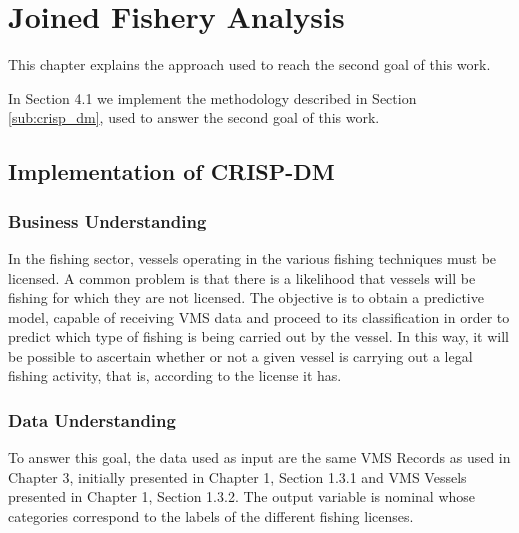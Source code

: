 % 
% 
%
\chapter{Joined Fishery Analysis}
\label{cha:server}
This chapter explains the approach used to reach the second goal of this work. 

In Section 4.1 we implement the methodology described in Section \ref{sub:crisp_dm}, used to answer the second goal of this work.



\section{Implementation of CRISP-DM} %
\label{sub:implementation}

\subsection{Business Understanding} %
\label{sub:business_understanding}

In the fishing sector, vessels operating in the various fishing techniques must be licensed.
A common problem is that there is a likelihood that vessels will be fishing for which they are not licensed. The objective is to obtain a predictive model, capable of receiving VMS data and proceed to its classification in order to predict which type of fishing is being carried out by the vessel. In this way, it will be possible to ascertain whether or not a given vessel is carrying out a legal fishing activity, that is, according to the license it has.





\subsection{Data Understanding} %
\label{sub:data_understanding}

To answer this goal, the data used as input are the same VMS Records as used in Chapter 3, initially presented in Chapter 1, Section 1.3.1 and VMS Vessels presented in Chapter 1, Section 1.3.2. The output variable is nominal whose categories correspond to the labels of the different fishing licenses.




